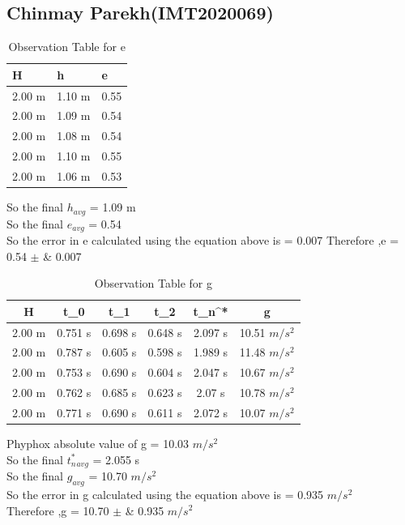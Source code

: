 \documentclass[11pt]{scrartcl} %
\begin{document}
\newpage
\subsection{Chinmay Parekh(IMT2020069)}

\begin{table}[h] %
	\centering %
	\begin{tabular}{l l l}
		\toprule
		\textbf{H} & \textbf{h} & \textbf{e} \\
		\midrule
		2.00 m & 1.10 m & 0.55\\
        2.00 m & 1.09 m  & 0.54\\
        2.00 m & 1.08 m  & 0.54\\
        2.00 m & 1.10 m & 0.55 \\
        2.00 m & 1.06 m & 0.53 \\
		\bottomrule
	\end{tabular}
	\caption{Observation Table for e}
\end{table}
So the final $h_{avg}$ = 1.09 m\\
So the final $e_{avg}$ = 0.54\\
So the error in e calculated using the equation above is  = 0.007 \newline
Therefore ,e = 0.54  $\pm$ &  0.007 \\

\begin{table}[h]
\centering
\begin{tabular}{||c c c c c c||} 
\toprule
 \hline
 H & t_0 & t_1 & t_2 & t_n^* & g \\ [0.5ex] 
 \midrule
 \hline\hline
 2.00 m & 0.751 s & 0.698 s  & 0.648 s & 2.097 s & 10.51 $m/s^2$  \\ 
 \hline
 2.00 m & 0.787 s & 0.605 s & 0.598 s & 1.989 s & 11.48 $m/s^2$  \\
 \hline
 2.00 m & 0.753 s & 0.690 s & 0.604 s & 2.047 s  & 10.67 $m/s^2$   \\
 \hline
 2.00 m & 0.762 s & 0.685 s & 0.623 s & 2.07 s  & 10.78 $m/s^2$   \\
 \hline
 2.00 m & 0.771 s & 0.690 s & 0.611 s & 2.072 s  & 10.07 $m/s^2$  \\ [1ex]
 \bottomrule
 \hline
\end{tabular}
\caption{Observation Table for g}
\end{table}
Phyphox absolute value of g = 10.03 $m/s^2$\\
So the final $t_n^*_{avg}$ = 2.055 s\\
So the final $g_{avg}$ = 10.70 $m/s^2$\\
So the error in g calculated using the equation above is  = 0.935 $m/s^2$\\
Therefore ,g = 10.70  $\pm$ &  0.935 $m/s^2$ \\
\newpage
\end{document}
